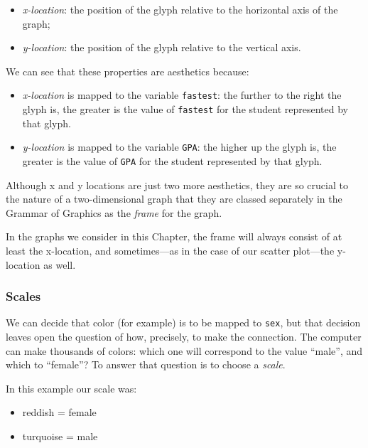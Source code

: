 \documentclass[]{book}
\providecommand{\tightlist}{%
  \setlength{\itemsep}{0pt}\setlength{\parskip}{0pt}}
\theoremstyle{definition}
\theoremstyle{definition}
\theoremstyle{definition}
\theoremstyle{remark}
\begin{document}
{\begin{itemize}
\tightlist
\item
  \emph{x-location}: the position of the glyph relative to the
  horizontal axis of the graph;
\item
  \emph{y-location}: the position of the glyph relative to the vertical
  axis.
\end{itemize}

We can see that these properties are aesthetics because:

\begin{itemize}
\tightlist
\item
  \emph{x-location} is mapped to the variable \texttt{fastest}: the
  further to the right the glyph is, the greater is the value of
  \texttt{fastest} for the student represented by that glyph.
\item
  \emph{y-location} is mapped to the variable \texttt{GPA}: the higher
  up the glyph is, the greater is the value of \texttt{GPA} for the
  student represented by that glyph.
\end{itemize}

Although x and y locations are just two more aesthetics, they are so
crucial to the nature of a two-dimensional graph that they are classed
separately in the Grammar of Graphics as the \emph{frame} for the graph.

In the graphs we consider in this Chapter, the frame will always consist
of at least the x-location, and sometimes---as in the case of our
scatter plot---the y-location as well.

\subsubsection{\texorpdfstring{Scales
}{Scales }}\label{scales}

We can decide that color (for example) is to be mapped to \texttt{sex},
but that decision leaves open the question of how, precisely, to make
the connection. The computer can make thousands of colors: which one
will correspond to the value ``male'', and which to ``female''? To
answer that question is to choose a \emph{scale}.

In this example our scale was:

\begin{itemize}
\tightlist
\item
  reddish = female
\item
  turquoise = male
\end{itemize}

}
\end{document}
